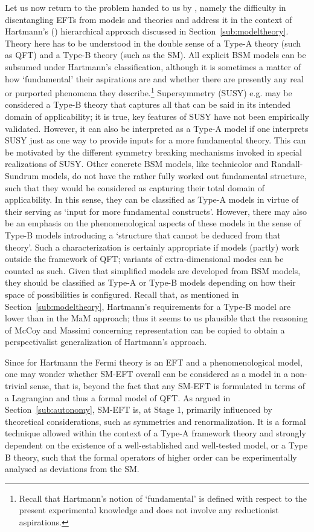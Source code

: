 Let us now return to the problem handed to us by \citet{hartmann2001}, namely the difficulty in disentangling EFTs from models and theories and address it in the context of Hartmann's (\citeyear{hartmann95}) hierarchical approach discussed in Section~\ref{sub:modeltheory}. 
Theory here has to be understood in the double sense of a Type-A theory (such as QFT) and a Type-B theory (such as the SM). 
All explicit BSM models can be subsumed under Hartmann's classification, although it is sometimes a matter of how `fundamental' their aspirations are and whether there are presently any real or purported phenomena they describe.\footnote{Recall that Hartmann's notion of `fundamental' is defined with respect to the present experimental knowledge and does not involve any reductionist aspirations.}
Supersymmetry (SUSY) e.g. may be considered a Type-B theory %
that captures all that can be said in its intended domain of applicability; it is true, key features of SUSY have not been empirically validated. 
However, it can also be interpreted as a Type-A model if one interprets SUSY just as one way to provide inputs for a more fundamental theory. 
This can be motivated by the different symmetry breaking mechanisms invoked in special realizations of SUSY. 
Other concrete BSM models, like technicolor and Randall-Sundrum models, do not have the rather fully worked out fundamental structure, such that they would be considered as capturing their total domain of applicability. 
In this sense, they can be classified as Type-A models in virtue of their serving as `input for more fundamental constructs'. 
However, there may also be an emphasis on the phenomenological aspects of these models in the sense of Type-B models introducing a `structure that cannot be deduced from that theory'. 
Such a characterization is certainly appropriate if models (partly) work outside the framework of QFT; variants of extra-dimensional modes can be counted as such. 
Given that simplified models are developed from BSM models, they should be classified as Type-A or Type-B models depending on how their space of possibilities is configured.
Recall that, as mentioned in Section~\ref{sub:modeltheory}, Hartmann's requirements for a Type-B model are lower than in the MaM approach; thus it seems to us plausible that the reasoning of McCoy and Massimi concerning representation can be copied to obtain a perspectivalist generalization of Hartmann's approach.

Since for Hartmann the Fermi theory is an EFT and a phenomenological model, one may wonder whether SM-EFT overall can be considered as a model in a non-trivial sense, that is, beyond the fact that any SM-EFT is formulated in terms of a Lagrangian and thus a formal model of QFT.
As argued in Section~\ref{sub:autonomy}, SM-EFT is, at Stage 1, primarily influenced by theoretical considerations, such as symmetries and renormalization. 
It is a formal technique allowed within the context of a Type-A framework theory and strongly dependent on the existence of a well-established and well-tested model, or a Type B theory, such that the formal operators of higher order can be experimentally analysed as deviations from the SM. 

